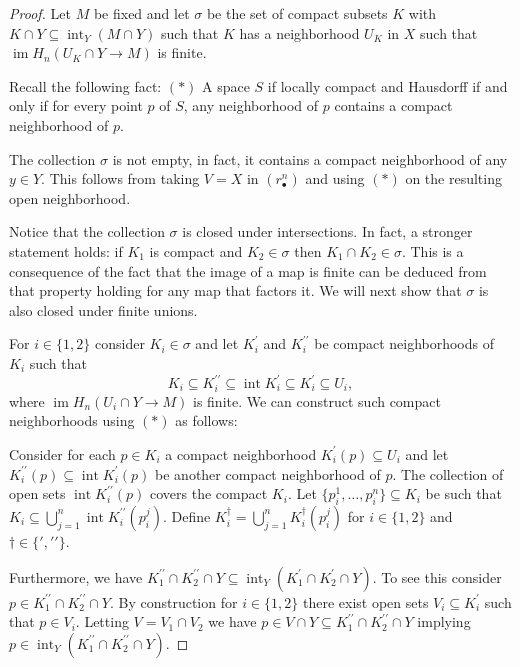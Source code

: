 \documentclass{amsart}
\theoremstyle{definition}
\newcommand{\dprime}{{\prime\prime}}
\DeclareMathOperator{\im}{im}
\DeclareMathOperator{\interior}{int}
\begin{document}
	\begin{proof}
		Let $M$ be fixed and let $\sigma$ be the set of compact subsets $K$ with $K \cap Y \subseteq \interior_Y(M \cap Y)$ such that $K$ has a neighborhood $U_K$ in $X$ such that $\im H_n\left(U_K \cap Y \to M\right)$ is finite.
		
		Recall the following fact:
		$(\ast)$ A space $S$ if locally compact and Hausdorff if and only if for every point $p$ of $S$, any neighborhood of $p$ contains a compact neighborhood of $p$.
		
		The collection $\sigma$ is not empty, in fact, it contains a compact neighborhood of any $y \in Y$. This follows from taking $V = X$ in $(r_\bullet^n)$ and using $(\ast)$ on the resulting open neighborhood.
		
		Notice that the collection $\sigma$ is closed under intersections. In fact, a stronger statement holds: if $K_1$ is compact and $K_2 \in \sigma$ then $K_1 \cap K_2 \in \sigma$. This is a consequence of the fact that the image of a map is finite can be deduced from that property holding for any map that factors it. We will next show that $\sigma$ is also closed under finite unions.
		
		For $i \in \{1, 2\}$ consider $K_i \in \sigma$ and let $K_i^\prime$ and $K_i^\dprime$ be compact neighborhoods of $K_i$ such that
		\begin{equation*}
		K_i \subseteq K_i^\dprime \subseteq \interior K_i^\prime \subseteq K_i^\prime \subseteq U_i,
		\end{equation*}
		where $\im H_n\left(U_i \cap Y \to M\right)$ is finite. 
		We can construct such compact neighborhoods using $(\ast)$ as follows:
		
		Consider for each $p \in K_i$ a compact neighborhood $K^\prime_i(p) \subseteq U_i$ and let $K_i^\dprime(p) \subseteq \interior K_i^\prime(p)$ be another compact neighborhood of $p$. The collection of open sets $\interior K_i^\dprime(p)$ covers the compact $K_i$. Let $\{p_i^{1}, \dots, p^{n}_i\} \subseteq K_i$ be such that $K_i \subseteq \bigcup_{j=1}^n \interior K^\dprime_i(p^j_i)$. Define $K_i^\dag = \bigcup_{j=1}^n K^\dag_i(p^j_i)$ for $i \in \{1,2\}$ and $\dag \in \{\prime, \dprime\}$.
		
		Furthermore, we have $K^\dprime_1 \cap K^\dprime_2 \cap Y \subseteq \interior_Y(K_1^\prime \cap K_2^\prime \cap Y)$. To see this consider $p \in K^\dprime_1 \cap K^\dprime_2 \cap Y$. By construction for $i \in \{1, 2\}$ there exist open sets $V_i \subseteq K_i^\prime$ such that $p \in V_i$. Letting $V = V_1 \cap V_2$ we have $p \in V \cap Y \subseteq K^\dprime_1 \cap K^\dprime_2 \cap Y$ implying $p \in \interior_Y(K^\dprime_1 \cap K^\dprime_2 \cap Y)$.
		

\end{proof}
\end{document}
